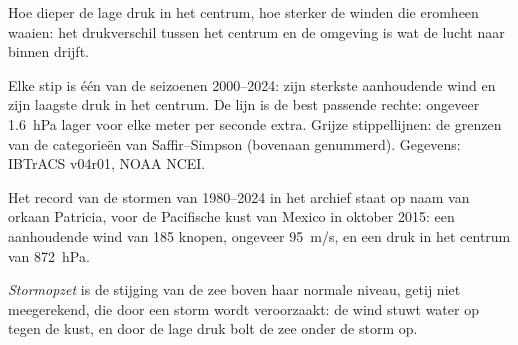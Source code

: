 Hoe dieper de lage druk in het centrum, hoe sterker de winden die eromheen waaien:
het drukverschil tussen het centrum en de omgeving is wat de lucht naar binnen
drijft.

\begin{omfigure}

{\small Elke stip is één  van de seizoenen 2000--2024: zijn
sterkste aanhoudende wind en zijn laagste druk in het centrum. De lijn is de
best passende rechte: ongeveer \qty{1.6}{hPa} lager voor elke meter per seconde
extra. Grijze stippellijnen: de grenzen van de categorieën van Saffir--Simpson
(bovenaan genummerd). Gegevens: IBTrACS v04r01, NOAA NCEI.}
\end{omfigure}

Het record van de stormen van 1980--2024 in het archief staat op naam van orkaan
Patricia, voor de Pacifische kust van Mexico in oktober 2015: een aanhoudende
wind van 185 knopen, ongeveer \qty{95}{m/s}, en een druk in het centrum van
\qty{872}{hPa}.

\begin{definition}[Stormopzet]\label{def:g10:storms-and-cyclones:storm-surge}
\emph{Stormopzet} is de stijging van de zee boven haar normale
niveau, getij niet meegerekend, die door een storm wordt veroorzaakt: de wind
stuwt water op tegen de kust, en door de lage druk bolt de zee onder de storm op.
\end{definition}

